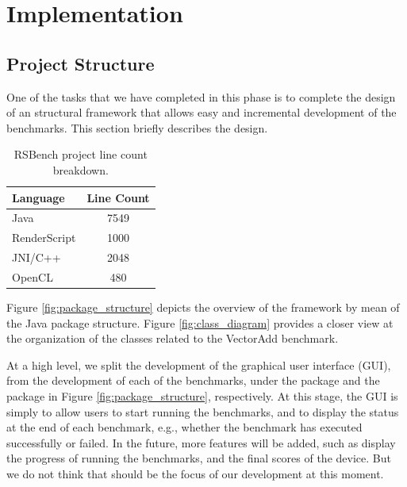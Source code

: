\section{Implementation}

\subsection{Project Structure}

One of the tasks that we have completed in this phase is to complete the design
of an structural framework that allows easy and incremental development of the
benchmarks. This section briefly describes the design.


\begin{table}[h]\small
\centering
\begin{tabular}{ | l | c |}
    \hline 
    Language &  Line Count \\ \hline
    Java & 7549 \\ \hline
    RenderScript & 1000 \\ \hline
    JNI/C++ & 2048 \\ \hline
    OpenCL & 480 \\ \hline
\end{tabular}
\caption{RSBench project line count breakdown.}
\label{table:breakdown}
\end{table}

Figure \ref{fig:package_structure} depicts the overview of the framework by mean
of the Java package structure. Figure \ref{fig:class_diagram} provides a closer
view at the organization of the classes related to the VectorAdd benchmark.

At a high level, we split the development of the graphical user interface (GUI),
from the development of each of the benchmarks, under the  package and the
 package in Figure \ref{fig:package_structure}, respectively. At this
stage, the GUI is simply to allow users to start running the benchmarks, and to 
display the status at the end of each benchmark, e.g., whether the benchmark has executed
successfully or failed. In the future, more features will be added, such as
display the progress of running the benchmarks, and the final scores of the
device. But we do not think that should be the focus of our development at this
moment.

